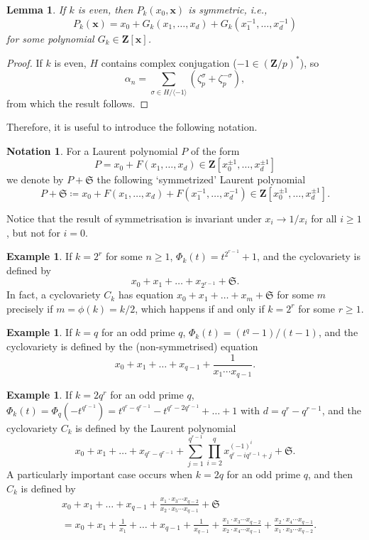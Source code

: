 \documentclass[12pt,reqno]{amsart}
\theoremstyle{definition}
\theoremstyle{plain}
\newtheorem{lemma}[theorem]{Lemma}
\theoremstyle{definition}
\newtheorem{notation}[theorem]{Notation}
\newtheorem{example}[theorem]{Example}
\newcommand{\Z}{\mathbf{Z}}
\newcommand{\sym}{\mathfrak{S}}
\renewcommand{\geq}{\geqslant}
\begin{document}
\begin{lemma} 
If $k$ is even, then $P_k(x_0, \mathbf{x})$ is symmetric, i.e., $$P_k(\mathbf{x}) = x_0 + G_k(x_1,\dots,x_d) + G_k(x_1^{-1},\dots,x_d^{-1})$$ for some polynomial $G_k \in \Z[\mathbf x]$. 
\end{lemma}

\begin{proof} 
If $k$ is even, $H$ contains complex conjugation ($-1 \in (\Z/p)^*$), so $$\alpha_n = \sum_{\sigma \in H/\langle -1 \rangle} \left( \zeta_p^\sigma + \zeta_p^{-\sigma} \right),$$ from which the result follows. 
\end{proof}

Therefore, it is useful to introduce the following notation. 

\begin{notation} 
For a Laurent polynomial $P$ of the form $$P=x_0 + F(x_1,\dots,x_d) \in \Z[x_0^{\pm 1},\dots,x_d^{\pm 1}]$$ we denote by $P+\sym$ the following `symmetrized' Laurent polynomial
$$ P+\sym\coloneqq  x_0 + F(x_1,\dots,x_d) + F(x_1^{-1},\dots,x_d^{-1})  \in  \Z[x_0^{\pm 1},\dots,x_d^{\pm 1}].$$
\end{notation}

Notice that the result of symmetrisation is invariant under $x_i \rightarrow 1/x_i$ for all $i \geq 1$, but not for $i=0$. 

\begin{example} 
\label{N2k} 
If $k=2^r$ for some $n \geq 1$, $\Phi_k(t) = t^{2^{r-1}}+1$, and the cyclovariety is defined by
$$ x_0+x_1+\dots+x_{2^{r-1}} + \sym. $$
In fact, a cyclovariety $C_k$ has equation $x_0+x_1+\dots+x_m +\sym$ for some $m$ precisely if $m=\phi(k) = k/2$, which happens if and only if $k=2^r$ for some $r \geq 1$. 
\end{example}

\begin{example} 
\label{Nq} 
If $k=q$ for an odd prime $q$, $\Phi_k(t) = (t^q-1)/(t-1)$, and the cyclovariety is defined by the (non-symmetrised) equation
$$ x_0+x_1+\dots+x_{q-1} + \frac{1}{x_1 \cdots x_{q-1}}. $$
\end{example}

 \begin{example} 
 \label{N2qn} 
 If $k=2 q^r$ for an odd prime $q$, $\Phi_{k}(t)=\Phi_q(-t^{q^{r-1}}) = t^{q^r-q^{r-1}} - t^{q^r-2q^{r-1}} + \dots + 1$ with $d=q^r-q^{r-1}$, and the cyclovariety $C_k$ is defined by the Laurent polynomial
$$x_0 + x_1 + \dots + x_{q^r-q^{r-1}} + \sum_{j=1}^{q^{r-1}} \prod_{i=2}^q x_{q^r-iq^{r-1}+j}^{(-1)^i} +  \sym. $$
A particularly important case occurs when $k=2q$ for an odd prime $q$, and then $C_k$ is defined by 
\begin{align} \label{N2ell} & x_0 + x_1 + \dots + x_{q-1} + \frac{x_1 \cdot x_3 \cdots x_{q-2}}{x_2 \cdot x_5 \cdots x_{q-1}}+  \sym \nonumber \\ 
& = x_0 + x_1 + \frac{1}{x_1} + \dots + x_{q-1}+\frac{1}{x_{q-1}} + \frac{x_1 \cdot x_3 \cdots x_{q-2}}{x_2 \cdot x_4 \cdots x_{q-1}} + \frac{x_2 \cdot x_4 \cdots x_{q-1}}{x_1 \cdot x_3 \cdots x_{q-2}}. \end{align} 
\end{example}
\end{document}
